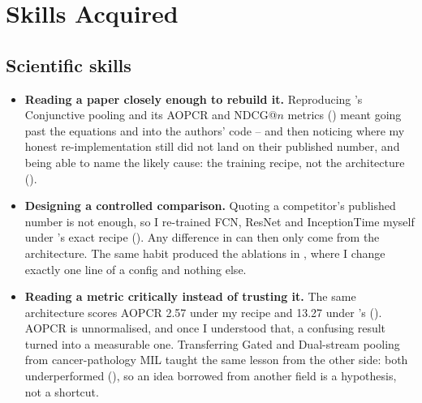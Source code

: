 %

\section{Skills Acquired}
\label{sec:skills}

\subsection{Scientific skills}

\begin{itemize}\itemsep3pt
  \item \textbf{Reading a paper closely enough to rebuild it.} Reproducing \millet{}'s Conjunctive
        pooling and its AOPCR and NDCG@$n$ metrics () meant going past the
        equations and into the authors' code -- and then noticing where my honest re-implementation
        still did not land on their published number, and being able to name the likely cause: the
        training recipe, not the architecture ().

  \item \textbf{Designing a controlled comparison.} Quoting a competitor's published number is not
        enough, so I re-trained FCN, ResNet and InceptionTime myself under \seanet{}'s exact recipe
        (). Any difference in  can then only come from
        the architecture. The same habit produced the ablations in , where I
        change exactly one line of a config and nothing else.

  \item \textbf{Reading a metric critically instead of trusting it.} The same architecture scores
        AOPCR 2.57 under my recipe and 13.27 under \millet{}'s (). AOPCR is
        unnormalised, and once I understood that, a confusing result turned into a measurable one.
        Transferring Gated and Dual-stream pooling from cancer-pathology MIL taught the same lesson
        from the other side: both underperformed (), so an idea borrowed
        from another field is a hypothesis, not a shortcut.
\end{itemize}

